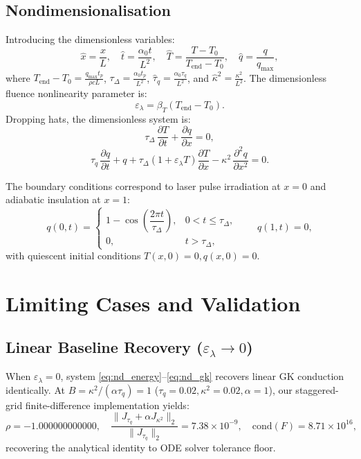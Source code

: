 \documentclass[preprint,12pt,a4paper]{elsarticle}
\begin{document}
\subsection{Nondimensionalisation}
Introducing the dimensionless variables:
\begin{equation}
  \hat{x} = \frac{x}{L}, \quad \hat{t} = \frac{\alpha_0 t}{L^2}, \quad \hat{T} = \frac{T - T_0}{T_{\mathrm{end}} - T_0}, \quad \hat{q} = \frac{q}{q_{\max}} ,
\end{equation}
where $T_{\mathrm{end}} - T_0 = \frac{q_{\max} t_p}{\rho c L}$, $\tau_\Delta = \frac{\alpha_0 t_p}{L^2}$, $\hat{\tau}_q = \frac{\alpha_0 \tau_q}{L^2}$, and $\hat{\kappa}^2 = \frac{\kappa^2}{L^2}$. The dimensionless fluence nonlinearity parameter is:
\begin{equation}
  \varepsilon_\lambda = \beta_T (T_{\mathrm{end}} - T_0) .
\end{equation}
Dropping hats, the dimensionless system is:
\begin{equation}
  \tau_\Delta \, \frac{\partial T}{\partial t} + \frac{\partial q}{\partial x} = 0 ,
  \label{eq:nd_energy}
\end{equation}
\begin{equation}
  \tau_q \, \frac{\partial q}{\partial t} + q + \tau_\Delta\left(1 + \varepsilon_\lambda T\right)\frac{\partial T}{\partial x} - \kappa^2 \, \frac{\partial^2 q}{\partial x^2} = 0 .
  \label{eq:nd_gk}
\end{equation}

The boundary conditions correspond to laser pulse irradiation at $x=0$ and adiabatic insulation at $x=1$:
\begin{equation}
  q(0,t) = \begin{cases} 1 - \cos\left(\dfrac{2\pi t}{\tau_\Delta}\right), & 0 < t \le \tau_\Delta , \\[1ex] 0, & t > \tau_\Delta , \end{cases} \qquad q(1,t) = 0 ,
  \label{eq:bcs}
\end{equation}
with quiescent initial conditions $T(x,0) = 0, q(x,0) = 0$.

\section{Limiting Cases and Validation}

\subsection{Linear Baseline Recovery ($\varepsilon_\lambda \to 0$)}
When $\varepsilon_\lambda = 0$, system \eqref{eq:nd_energy}--\eqref{eq:nd_gk} recovers linear GK conduction identically. At $B = \kappa^2/(\alpha \tau_q) = 1$ ($\tau_q = 0.02, \kappa^2 = 0.02, \alpha = 1$), our staggered-grid finite-difference implementation yields:
\begin{equation}
  \rho = -1.000000000000, \quad \frac{\|J_{\tau_q} + \alpha J_{\kappa^2}\|_2}{\|J_{\tau_q}\|_2} = 7.38 \times 10^{-9}, \quad \mathrm{cond}(F) = 8.71 \times 10^{16} ,
\end{equation}
recovering the analytical identity to ODE solver tolerance floor.
\end{document}

